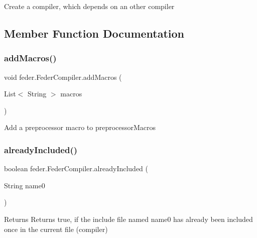 Create a compiler, which depends on an other compiler 

\subsection{Member Function Documentation}
\mbox{\label{classfeder_1_1FederCompiler_aac12b9b09fb8a5a0caaf62e021bbeae7}} 
\subsubsection{\texorpdfstring{add\+Macros()}{addMacros()}}
{\footnotesize\ttfamily void feder.\+Feder\+Compiler.\+add\+Macros (\begin{DoxyParamCaption}\item[{List$<$ String $>$}]{macros }\end{DoxyParamCaption})}

Add a preprocessor macro to preprocessor\+Macros \mbox{\label{classfeder_1_1FederCompiler_a33c8a6aab78bef99df17306c9a3e9c95}} 
\subsubsection{\texorpdfstring{already\+Included()}{alreadyIncluded()}}
{\footnotesize\ttfamily boolean feder.\+Feder\+Compiler.\+already\+Included (\begin{DoxyParamCaption}\item[{String}]{name0 }\end{DoxyParamCaption})}

\begin{DoxyReturn}{Returns}
Returns true, if the include file named \textquotesingle{}name0\textquotesingle{} has already been included once in the current file (compiler) 
\end{DoxyReturn}
\mbox{\label{classfeder_1_1FederCompiler_adfef64d211b87229b254e05144d00caf}} 
